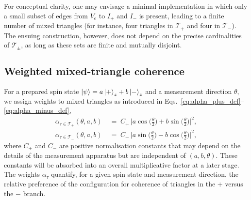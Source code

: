 \documentclass[11pt,a4paper]{article}
\numberwithin{equation}{section}
\begin{document}
For conceptual clarity, one may envisage a minimal implementation in which only a small subset of edges from $V_e$ to $I_+$ and $I_-$ is present, leading to a finite number of mixed triangles (for instance, four triangles in $\mathcal{T}_+$ and four in $\mathcal{T}_-$). The ensuing construction, however, does not depend on the precise cardinalities of $\mathcal{T}_\pm$, as long as these sets are finite and mutually disjoint.

\subsection{Weighted mixed-triangle coherence}
\label{subsec:weighted_cost}

For a prepared spin state $\ket{\psi}=a\ket{+}_z+b\ket{-}_z$ and a measurement direction $\theta$, we assign weights to mixed triangles as introduced in Eqs.~\eqref{eq:alpha_plus_def}--\eqref{eq:alpha_minus_def},
\begin{align}
  \alpha_{\tau\in \mathcal{T}_+}(\theta,a,b)
  &\;=\;
  C_+\,\bigg|a\cos\Big(\frac{\theta}{2}\Big)+b\sin\Big(\frac{\theta}{2}\Big)\bigg|^2,
  \label{eq:alpha_plus}\\[0.4em]
  \alpha_{\tau\in \mathcal{T}_-}(\theta,a,b)
  &\;=\;
  C_-\,\bigg|a\sin\Big(\frac{\theta}{2}\Big)-b\cos\Big(\frac{\theta}{2}\Big)\bigg|^2,
  \label{eq:alpha_minus}
\end{align}
where $C_+$ and $C_-$ are positive normalisation constants that may depend on the details of the measurement apparatus but are independent of $(a,b,\theta)$. These constants will be absorbed into an overall multiplicative factor at a later stage. The weights $\alpha_\tau$ quantify, for a given spin state and measurement direction, the relative preference of the configuration for coherence of triangles in the $+$ versus the $-$ branch.
\end{document}

